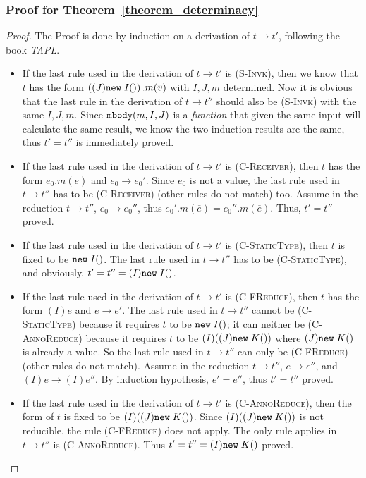 \subsubsection{Proof for Theorem~\ref{theorem_determinacy}}
\begin{proof}	
The Proof is done by induction on a derivation of $t \to t'$, following the book  \emph{TAPL}.
\begin{itemize}
	\item If the last rule used in the derivation of $t \to t'$ is \textsc{(S-Invk)}, then we know that $t$ has the form $\left((J)\texttt{new} \; I()\right).m(\overline{v})$ with $I, J, m$ determined. Now it is obvious that the last rule in the derivation of $t \to t''$ should also be \textsc{(S-Invk)} with the same $I, J, m$. Since $\texttt{mbody}(m, I, J)$ is a \emph{function} that given the same input will calculate the same result, we know the two induction results are the same, thus $t' = t''$ is immediately proved.
	
	\item If the last rule used in the derivation of $t \to t'$ is \textsc{(C-Receiver)}, then $t$ has the form $e_0.m(\overline{e})$ and $e_0 \to e_0'$. Since $e_0$ is not a value, the last rule used in $t \to t''$ has to be \textsc{(C-Receiver)} (other rules do not match) too. Assume in the reduction $t \to t''$, $e_0 \to e_0''$, thus $e_0'.m(\overline{e}) = e_0''.m(\overline{e})$. Thus, $t' = t''$ proved.
	
	\item If the last rule used in the derivation of $t \to t'$ is \textsc{(C-StaticType)}, then $t$ is fixed to be $\texttt{new} \; I()$. The last rule used in $t \to t''$  has to be \textsc{(C-StaticType)}, and obviously, $t' = t'' = (I)\texttt{new} \; I()$.
	
	\item If the last rule used in the derivation of $t \to t'$ is \textsc{(C-FReduce)}, then $t$ has the form $(I)e$ and $e \to e'$. The last rule used in $t \to t''$ cannot be \textsc{(C-StaticType)} because it requires $t$ to be $\texttt{new} \; I()$; it can neither be \textsc{(C-AnnoReduce)} because it requires $t$ to be $(I)((J)\texttt{new} \; K())$ where $(J)\texttt{new} \; K()$ is already a value. So the last rule used in $t \to t''$ can only be \textsc{(C-FReduce)} (other rules do not match). Assume in the reduction $t \to t''$, $e \to e''$, and $(I)e \to (I)e''$. By induction hypothesis, $e' = e''$, thus $t' = t''$ proved.
	
	\item If the last rule used in the derivation of $t \to t'$ is \textsc{(C-AnnoReduce)}, then the form of $t$ is fixed to be $(I)((J)\texttt{new} \; K())$. Since $(I)((J)\texttt{new} \; K())$ is not reducible, the rule \textsc{(C-FReduce)} does not apply. The only rule applies in $t \to t''$ is \textsc{(C-AnnoReduce)}. Thus $t' = t'' = (I)\texttt{new} \; K()$ proved.
	

\end{itemize}
\end{proof}
